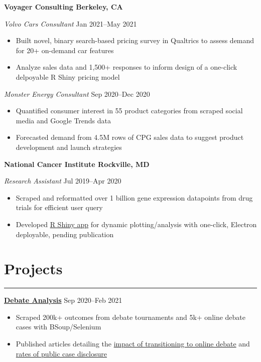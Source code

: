 \documentclass[11pt]{article}
\newcommand{\resumesection}[1]{\vspace{-0.6cm}\section*{\color{highlight}#1}\vspace{-0.3cm}\hrule\vspace{0.2cm}}
\begin{document}
\textbf{Voyager Consulting \hfill Berkeley, CA}\par

\textit{Volvo Cars Consultant} \hfill Jan 2021--May 2021
\begin{itemize}
	\item Built novel, binary search-based pricing survey in Qualtrics to assess demand for 20+ on-demand car features
	\item Analyze sales data and 1,500+ responses to inform design of a one-click delpoyable R Shiny pricing model
\end{itemize}\par

\textit{Monster Energy Consultant} \hfill Sep 2020--Dec 2020
\begin{itemize}
	\item Quantified consumer interest in 55 product categories from scraped social media and Google Trends data
	\item Forecasted demand from 4.5M rows of CPG sales data to suggest product development and launch strategies
\end{itemize}\par

\textbf{National Cancer Institute \hfill Rockville, MD}\par

\textit{Research Assistant} \hfill Jul 2019--Apr 2020 \par
\begin{itemize}
	\item Scraped and reformatted over 1 billion gene expression datapoints from drug trials for efficient user query
	\item Developed \href{https://github.com/petezh/TP-Workbench}{R Shiny app} for dynamic plotting/analysis with one-click, Electron deployable, pending publication
\end{itemize}\vspace{0.1cm}

\resumesection{Projects}

\textbf{\href{https://github.com/petezh/E-Debate}{Debate Analysis}} \hfill Sep 2020--Feb 2021\par
\begin{itemize}
	\item Scraped 200k+ outcomes from debate tournaments and 5k+ online debate cases with BSoup/Selenium
	\item Published articles detailing the \href{https://www.vbriefly.com/2020/12/31/five-trends-among-e-debate-competitors-by-peter-zhang/}{impact of transitioning to online debate} and \href{https://www.vbriefly.com/2021/01/22/disclosure-in-numbers-by-peter-zhang/}{rates of public case disclosure}
\end{itemize}\vspace{0.1cm} \par
\end{document}
